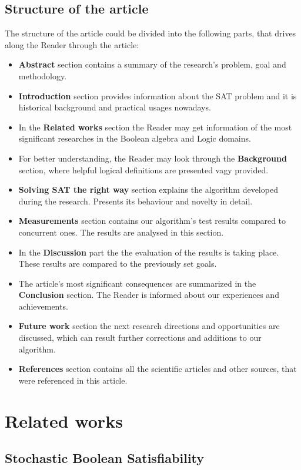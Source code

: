 \documentclass{article}
\begin{document}
\subsection{Structure of the article}
The structure of the article could be divided into the following parts, that drives along the Reader through the article:
\begin{itemize}
    \item \textbf{Abstract} section contains a summary of the research's problem, goal and methodology.
    \item \textbf{Introduction} section provides information about the SAT problem and it is historical background and practical usages nowadays.
    \item In the \textbf{Related works} section the Reader may get information of the most significant researches in the Boolean algebra and Logic domains.
    \item For better understanding, the Reader may look through the \textbf{Background} section, where helpful logical definitions are presented vagy provided.
    \item \textbf{Solving SAT the right way} section explains the algorithm developed during the research. Presents its behaviour and novelty in detail.
    \item \textbf{Measurements} section contains our algorithm's test results compared to concurrent ones. The results are analysed in this section.
    \item In the \textbf{Discussion} part the the evaluation of the results is taking place. These results are compared to the previously set goals.
    \item The article's most significant consequences are summarized in the \textbf{Conclusion} section. The Reader is informed about our experiences and achievements.
    \item \textbf{Future work} section the next research directions and opportunities are discussed, which can result further corrections and additions to our algorithm.
    \item \textbf{References} section contains all the scientific articles and other sources, that were referenced in this article.
\end{itemize}

\section{Related works}

\subsection{Stochastic Boolean Satisfiability \cite{sbs}}
\end{document}
